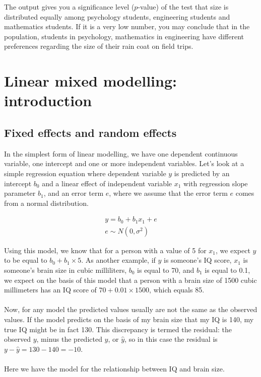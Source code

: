 \documentclass[]{report}\usepackage[]{graphicx}\usepackage[]{color}
\begin{document}
The output gives you a significance level ($p$-value) of the test that size is distributed equally among psychology students, engineering students and mathematics students. If it is a very low number, you may conclude that in the population, students in psychology, mathematics in engineering have different preferences regarding the size of their rain coat on field trips. 






\chapter{Linear mixed modelling: introduction}


\section{Fixed effects and random effects}
In the simplest form of linear modelling, we have one dependent continuous variable, one intercept and one or more independent variables. Let's look at a simple regression equation where dependent variable $y$ is predicted by an intercept $b_0$ and a linear effect of independent variable $x_1$ with regression slope parameter $b_1$, and an error term $e$, where we assume that the error term $e$ comes from a normal distribution. 


\begin{eqnarray}
y = b_0 + b_1 x_1 + e \\
e \sim N(0, \sigma^2)
\end{eqnarray}

Using this model, we know that for a person with a value of 5 for $x_1$, we expect $y$ to be equal to $b_0 + b_1 \times 5$. As another example, if $y$ is someone's IQ score, $x_1$ is someone's brain size in cubic milliliters, $b_0$ is equal to 70, and $b_1$ is equal to 0.1, we expect on the basis of this model that a person with a brain size of 1500 cubic millimeters has an IQ score of $70 + 0.01 \times 1500$, which equals 85.
\\
\\
Now, for any model the predicted values usually are not the same as the observed values. If the model predicts on the basis of my brain size that my IQ is 140, my true IQ might be in fact 130. This discrepancy is termed the residual: the observed $y$, minus the predicted $y$, or $\hat{y}$, so in this case the residual is $y - \hat{y}=130-140= -10$.
\\
\\
Here we have the model for the relationship between IQ and brain size.
\end{document}
